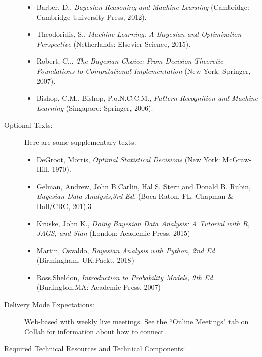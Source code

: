 \documentclass[11pt]{article}
\begin{document}
\begin{description}
\begin{itemize}
\item Barber, D., \textit{Bayesian Reasoning and Machine Learning} (Cambridge: Cambridge University Press, 2012).
\item Theodoridis, S., \textit{Machine Learning: A Bayesian and Optimization Perspective } (Netherlands:
Elsevier Science, 2015).
\item Robert, C.,. \textit{The Bayesian Choice: From Decision-Theoretic Foundations to Computational
Implementation} (New York: Springer, 2007).
\item Bishop, C.M., Bishop, P.o.N.C.C.M., \textit{Pattern Recognition and Machine Learning} (Singapore:
Springer, 2006).
\end{itemize}

\item[Optional Texts:]  

Here are some supplementary texts.

\begin{itemize}
\item DeGroot, Morris, \textit{Optimal Statistical Decisions} (New York: McGraw-Hill, 1970).
\item Gelman, Andrew, John B.Carlin, Hal S. Stern,and Donald B. Rubin, \textit{Bayesian Data Analysis,3rd
Ed.} (Boca Raton, FL: Chapman \& Hall/CRC, 201).3
\item Kruske, John K., \textit{Doing Bayesian Data Analysis: A Tutorial with R, JAGS, and Stan} (London:
Academic Press, 2015)
\item Martin, Osvaldo, \textit{Bayesian Analysis with Python, 2nd Ed.} (Birmingham, UK:Packt, 2018)
\item Ross,Sheldon, \textit{Introduction to Probability Models, 9th Ed.} (Burlington,MA: Academic Press,
2007)
\end{itemize}



\item[Delivery Mode Expectations:]  

Web-based with weekly live meetings. See the ``Online Meetings" tab on Collab for information about how to connect.

\item[Required Technical Resources and Technical Components:]  


\end{description}
\end{document}
